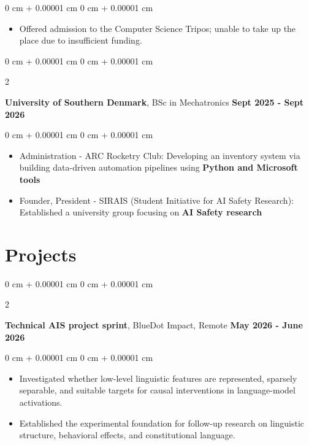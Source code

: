 \documentclass[10pt, letterpaper]{article}
\newenvironment{highlights}{
    \begin{itemize}[
        topsep=0.10 cm,
        parsep=0.10 cm,
        partopsep=0pt,
        itemsep=0pt,
        leftmargin=0 cm + 10pt
    ]
}{
    \end{itemize}
} %
\newenvironment{onecolentry}{
    \begin{adjustwidth}{
        0 cm + 0.00001 cm
    }{
        0 cm + 0.00001 cm
    }
}{
    \end{adjustwidth}
} %
\newenvironment{twocolentry}[2][]{
    \onecolentry
    \def\secondColumn{#2}
    \setcolumnwidth{\fill, 4.5 cm}
    \begin{paracol}{2}
}{
    \switchcolumn \raggedleft \secondColumn
    \end{paracol}
    \endonecolentry
} %
\begin{document}
        \begin{onecolentry}
            \begin{highlights}
                \item  Offered admission to the Computer Science Tripos; unable to take up the place due to insufficient funding.
            \end{highlights}
        \end{onecolentry}

    \begin{twocolentry}{\textbf{Sept 2025 - Sept 2026}}
        
        \textbf{University of Southern Denmark}, BSc in Mechatronics \end{twocolentry}

        \vspace{0.1 cm}

        \begin{onecolentry}
            \begin{highlights}
                \item Administration - ARC Rocketry Club: Developing an inventory system via building data-driven automation pipelines using \textbf{Python and Microsoft tools}
                \item Founder, President - SIRAIS (Student Initiative for AI Safety Research): Established a university group focusing on \textbf{AI Safety research}
            \end{highlights}
        \end{onecolentry}

        \vspace{0.2cm}

\section{Projects}
    
        \begin{twocolentry}{
        \textbf{May 2026 - June 2026}
        }
            \textbf{Technical AIS project sprint}, BlueDot Impact, Remote\end{twocolentry}

        \vspace{0.1 cm}
        
        \begin{onecolentry}
            \begin{highlights}
                \item Investigated whether low-level linguistic features are represented, sparsely separable, and suitable targets for causal interventions in language-model activations.
                \item Established the experimental foundation for follow-up research on linguistic structure, behavioral effects, and constitutional language.
            \end{highlights}
        \end{onecolentry}
    
\end{document}
